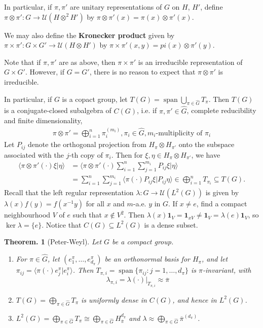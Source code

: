 \documentclass[11pt, a4paper]{memoir}
\theoremstyle{change}
\newtheorem{theorem}{Theorem.}[section]
\theoremstyle{plain}
\theoremstyle{nonumberplain}
\DeclareMathOperator{\spn}{span}
\newcommand{\defn}[1]{{\boldmath\bfseries #1}}
\newcommand{\idc}[1]{\ensuremath{\mathbf{1}_{#1}}}
\numberwithin{equation}{section}
\begin{document}
In particular, if $\pi,\pi'$ are unitary representations of $G$ on $H$, $H'$, define $\pi\otimes\pi':G\to\mathcal{U}(H\otimes^2 H')$ by $\pi\otimes\pi'(x)=\pi(x)\otimes\pi'(x)$.

We may also define the \defn{Kronecker product} given by $\pi\times\pi':G\times G'\to\mathcal{U}(H\otimes H')$ by $\pi\times\pi'(x,y)=pi(x)\otimes\pi'(y)$.

Note that if $\pi,\pi'$ are as above, then $\pi\times\pi'$ is an irreducible representation of $G\times G'$.
However, if $G=G'$, there is no reason to expect that $\pi\otimes\pi'$ is irreducible.

In particular, if $G$ is a copact group, let $T(G)=\spn\bigcup_{\pi\in\hat{G}}T_\pi$.
Then $T(G)$ is a conjugate-closed subalgebra of $C(G)$, i.e. if $\pi,\pi'\in\widehat{G}$, complete reducibility and finite dimensionality,
\begin{align*}
    \pi\otimes\pi'=\bigoplus_{i=1}^n\pi_i^{(m_i)},\pi_i\in\widehat{G},m_i\text{-multiplicity of }\pi_i
\end{align*}
Let $P_{ij}$ denote the orthogonal projection from $H_\pi\otimes H_{\pi'}$ onto the subspace associated with the $j$-th copy of $\pi_i$.
Then for $\xi,\eta\in H_\pi\otimes H_{\pi'}$, we have
\begin{align*}
    \langle\pi\otimes\pi'(\cdot)\xi|\eta\rangle &= \langle\pi\otimes\pi'(\cdot)\sum_{i=1}^n\sum_{j=1}^{m_i}P_{ij}\xi|\eta\rangle\\
                                                &= \sum_{i=1}^n\sum_{j=1}^{m_i}\langle\pi(\cdot)P_{ij}\xi|P_{ij}\eta\rangle\in\bigoplus_{i=1}^n T_{\pi_i}\subseteq T(G).
\end{align*}
Recall that the left regular representation $\lambda:G\to\mathcal{U}(L^2(G))$ is given by $\lambda(x)f(y)=f(x^{-1}y)$ for all $x$ and $m$-a.e. $y$ in $G$.
If $x\neq e$, find a compact neighbourhood $V$ of $e$ such that $x\notin V^2$.
Then $\lambda(x)\idc{V}=\idc{xV}\neq\idc{V}=\lambda(e)\idc{V}$, so $\ker\lambda=\{e\}$.
Notice that $C(G)\subseteq L^2(G)$ is a dense subset.
\begin{theorem}[Peter-Weyl]
    Let $G$ be a compact group.
    \begin{enumerate}[nl,r]
        \item For $\pi\in\widehat{G}$, let $(e_1^\pi,\ldots,e_{d_\pi}^\pi)$ be an orthonormal basis for $H_\pi$, and let $\pi_{ij}=\langle\pi(\cdot)e_j^\pi|e_i^\pi\rangle$.
            Then $T_{\pi,i}=\spn\{\pi_{ij}:j=1,\ldots,d_\pi\}$ is $\pi$-invariant, with
            \begin{equation*}
                \lambda_{\pi,i}=\lambda(\cdot)|_{T_{\pi,i}}\approx\overline{\pi}
            \end{equation*}
        \item $T(G)=\bigoplus_{\pi\in\widehat{G}}T_\pi$ is uniformly dense in $C(G)$, and hence in $L^2(G)$.
        \item $L^2(G)=\bigoplus_{\pi\in\widehat{G}}T_\pi\cong\bigoplus_{\pi\in\widehat{G}}H_{\overline{\pi}}^{d_\pi}$ and $\lambda\approx\bigoplus_{\pi\in\widehat{G}}\overline{\pi}^{(d_\pi)}$.
    \end{enumerate}
\end{theorem}
\end{document}
